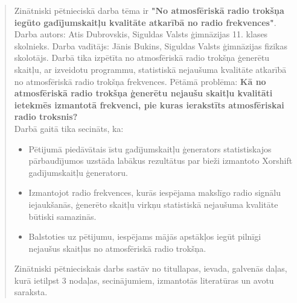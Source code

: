 \documentclass[12pt]{article}
\begin{document}
    \begin{abstract}
    Zinātniski pētnieciskā darba tēma ir \textbf{"No atmosfēriskā radio trokšņa iegūto gadījumskaitļu kvalitāte atkarībā no radio frekvences"}. 
    Darba autors: Atis Dubrovskis, Siguldas Valsts ģimnāzijas 11. klases skolnieks. Darba vadītājs:
    Jānis Bukins, Siguldas Valsts ģimnāzijas fizikas skolotājs. 
    Darbā tika izpētīta no atmosfēriskā radio trokšņa ģenerētu skaitļu, ar izveidotu programmu, statistiskā nejaušuma  kvalitāte atkarībā no atmosfēriskā radio trokšņa frekvences.
    Pētāmā problēma: \textbf{Kā no atmosfēriskā radio trokšņa ģenerētu nejaušu skaitļu kvalitāti ietekmēs izmantotā frekvenci, pie kuras ierakstīts atmosfēriskai radio troksnis?} \\
        Darbā gaitā tika secināts, ka:
\begin{itemize}
\Centering
        \item Pētijumā piedāvātais īstu gadījumskaitļu ģenerators statistiskajos pārbaudījumos uzstāda labākus rezultātus par bieži izmantoto Xorshift gadījumskaitļu ģeneratoru.
        \item Izmantojot radio frekvences, kurās iespējama makslīgo radio signālu iejaukšanās, ģenerēto skaitļu virkņu statistiskā nejaušuma kvalitāte būtiski samazinās.
        \item Balstoties uz pētijumu, iespējams mājās apstākļos iegūt pilnīgi nejaušus skaitļus no atmosfēriskā radio trokšņa.
\end{itemize}
Zinātniski pētnieciskais darbs sastāv no titullapas, ievada, galvenās daļas, kurā ietilpst 3
nodaļas, secinājumiem, izmantotās literatūras un avotu saraksta.
    \end{abstract}
\end{document}
